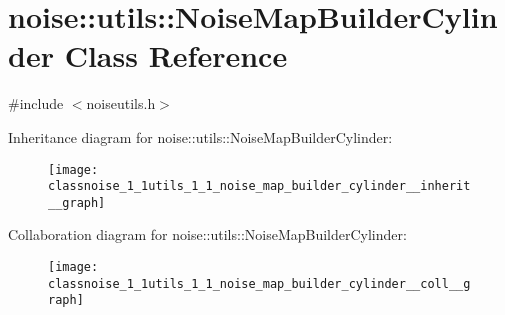 \hypertarget{classnoise_1_1utils_1_1_noise_map_builder_cylinder}{\section{noise\+:\+:utils\+:\+:Noise\+Map\+Builder\+Cylinder Class Reference}
\label{classnoise_1_1utils_1_1_noise_map_builder_cylinder}
}


{\ttfamily \#include $<$noiseutils.\+h$>$}



Inheritance diagram for noise\+:\+:utils\+:\+:Noise\+Map\+Builder\+Cylinder\+:\nopagebreak
\begin{figure}[H]
\begin{center}
\leavevmode
\texttt{[image: classnoise\_1\_1utils\_1\_1\_noise\_map\_builder\_cylinder\_\_inherit\_\_graph]}
\end{center}
\end{figure}


Collaboration diagram for noise\+:\+:utils\+:\+:Noise\+Map\+Builder\+Cylinder\+:\nopagebreak
\begin{figure}[H]
\begin{center}
\leavevmode
\texttt{[image: classnoise\_1\_1utils\_1\_1\_noise\_map\_builder\_cylinder\_\_coll\_\_graph]}
\end{center}
\end{figure}
